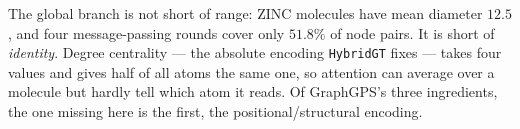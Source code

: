 The global branch is not short of range: ZINC molecules have mean diameter $12.5$, and four
message-passing rounds cover only $51.8\%$ of node pairs. It is short of \emph{identity}.
Degree centrality --- the absolute encoding \texttt{HybridGT} fixes --- takes four values and
gives half of all atoms the same one, so attention can average over a molecule but hardly
tell which atom it reads. Of GraphGPS's three ingredients, the one missing here is the first,
the positional/structural encoding.

